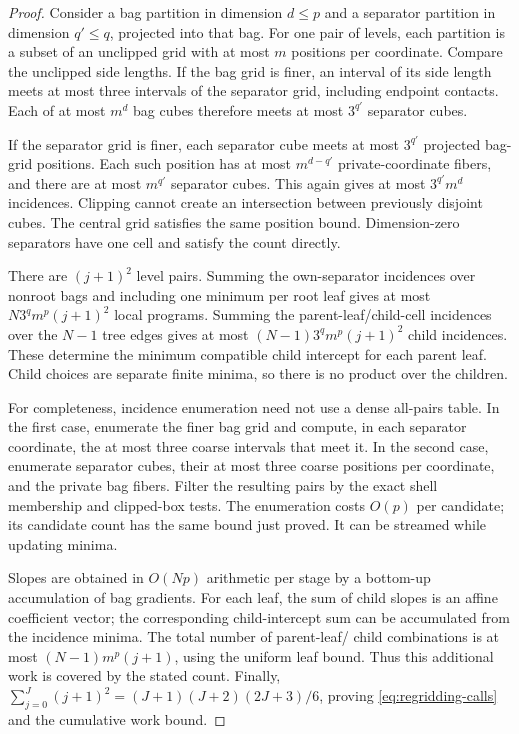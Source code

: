 \begin{proof}
Consider a bag partition in dimension $d\le p$ and a separator
partition in dimension $q'\le q$, projected into that bag. For
one pair of levels, each partition is a subset of an unclipped
grid with at most $m$ positions per coordinate. Compare the
unclipped side lengths. If the bag grid is finer, an interval of
its side length meets at most three intervals of the separator
grid, including endpoint contacts. Each of at most $m^d$ bag
cubes therefore meets at most $3^{q'}$ separator cubes.

If the separator grid is finer, each separator cube meets at
most $3^{q'}$ projected bag-grid positions. Each such position
has at most $m^{d-q'}$ private-coordinate fibers, and there are
at most $m^{q'}$ separator cubes. This again gives at most
$3^{q'}m^d$ incidences. Clipping cannot create an intersection
between previously disjoint cubes. The central grid satisfies
the same position bound. Dimension-zero separators have one
cell and satisfy the count directly.

There are $(j+1)^2$ level pairs. Summing the own-separator
incidences over nonroot bags and including one minimum per root
leaf gives at most $N3^qm^p(j+1)^2$ local programs. Summing the
parent-leaf/child-cell incidences over the $N-1$ tree edges
gives at most $(N-1)3^qm^p(j+1)^2$ child incidences. These
determine the minimum compatible child intercept for each
parent leaf. Child choices are separate finite minima, so
there is no product over the children.

For completeness, incidence enumeration need not use a dense
all-pairs table. In the first case, enumerate the finer bag
grid and compute, in each separator coordinate, the at most
three coarse intervals that meet it. In the second case,
enumerate separator cubes, their at most three coarse
positions per coordinate, and the private bag fibers.
Filter the resulting pairs by the exact shell membership and
clipped-box tests. The enumeration costs $O(p)$ per candidate;
its candidate count has the same bound just proved. It can be
streamed while updating minima.

Slopes are obtained in $O(Np)$ arithmetic per stage by a
bottom-up accumulation of bag gradients. For each leaf,
the sum of child slopes is an affine coefficient vector;
the corresponding child-intercept sum can be accumulated
from the incidence minima. The total number of parent-leaf/
child combinations is at most $(N-1)m^p(j+1)$, using the
uniform leaf bound. Thus this additional work is covered by
the stated count. Finally,
$\sum_{j=0}^J(j+1)^2=(J+1)(J+2)(2J+3)/6$, proving
\eqref{eq:regridding-calls} and the cumulative work bound.
\end{proof}

